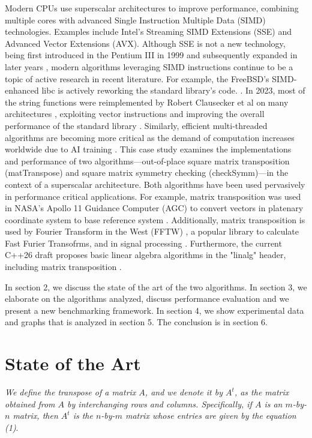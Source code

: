\documentclass[conference]{IEEEtran}
\begin{document}
Modern CPUs use superscalar architectures to improve performance, combining multiple cores with advanced Single Instruction Multiple Data (SIMD) technologies. Examples include Intel's Streaming SIMD Extensions (SSE) and Advanced Vector Extensions (AVX). Although SSE is not a new technology, being first introduced in the Pentium III in 1999 and subsequently expanded in later years \cite{b1}, modern algorithms leveraging SIMD instructions continue to be a topic of active research in recent literature.
For example, the FreeBSD's SIMD-enhanced libc is actively reworking the standard library's code. \cite{b2}.
In 2023, most of the string functions were reimplemented by Robert Clausecker et al on many architectures \cite{b3}, exploiting vector instructions and improving the overall performance of the standard library \cite{b4}.
Similarly, efficient multi-threaded algorithms are becoming more critical as the demand of computation increases worldwide due to AI training \cite{b5} \cite{b6}.
This case study examines the implementations and performance of two algorithms—out-of-place square matrix transposition (matTranspose) and square matrix symmetry checking (checkSymm)—in the context of a superscalar architecture. Both algorithms have been used pervasively in performance critical applications. For example, matrix transposition was used in NASA's Apollo 11 Guidance Computer (AGC) to convert vectors in platenary coordinate system to base reference system \cite{b7}. Additionally, matrix transposition is used by Fourier Transform in the West (FFTW) \cite{b8}, a popular library to calculate Fast Furier Transofrms, and in signal processing \cite{b9}. Furthermore, the current C++26 draft proposes basic linear algebra algorithms in the "linalg" header, including matrix transposition \cite{b10}.

In section 2, we discuss the state of the art of the two algorithms.
In section 3, we elaborate on the algorithms analyzed, discuss performance evaluation and we present a new benchmarking framework.
In section 4, we show experimental data and graphs that is analyzed
in section 5. The conclusion is in section 6.


\section{State of the Art}

\iffalse

\textit{We define the transpose of a matrix $A$, and we denote it by $A^t$, as the matrix obtained from $A$ by interchanging rows and columns. Specifically, if $A$ is an $m$-by-$n$ matrix, then $A^t$ is the $n$-by-$m$ matrix whose entries are given by the equation (1)}. \cite{b11}
\end{document}

